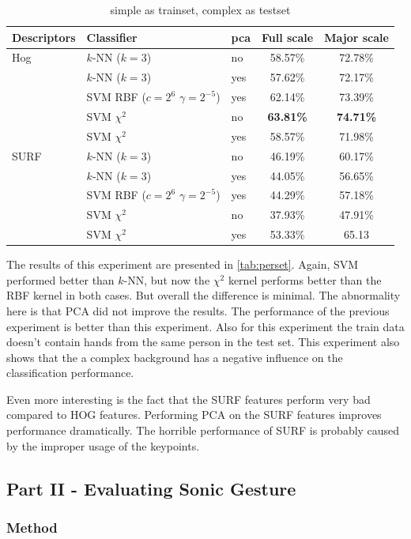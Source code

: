 \begin{table}
\centering
\begin{tabular}{lllcc}
\hline\hline
Descriptors & Classifier 		& pca		&  	Full scale	&	Major scale	\\
\hline
Hog & $k$-NN ($k=3$)& no	&	58.57\% 	&	72.78\%	\\
& $k$-NN ($k=3$)	& yes	&	57.62\% 	&	72.17\%	\\
& SVM RBF ($c=2^6$ $\gamma=2^{-5}$)			& yes & 62.14\%	&	73.39\%	\\
& SVM $\chi^2$ 		&	no	&	\textbf{63.81\%}		&	\textbf{74.71\%}\\
& SVM $\chi^2$		&	yes &	58.57\% 	&	71.98\% \\
\hline
SURF & $k$-NN ($k=3$)&	no	&	46.19\% 	&	60.17\%	\\
& $k$-NN ($k=3$)	&	yes &	44.05\%		& 56.65\% \\
& SVM RBF ($c=2^6$ $\gamma=2^{-5}$)			& yes &	44.29\%	&	57.18\%	\\
& SVM $\chi^2$		&	no	&	37.93\%		&	47.91\%	\\
& SVM $\chi^2$		&	yes	&	53.33\% 	&	65.13 \\
\hline
\end{tabular}
\caption{simple as trainset, complex as testset}
\label{tab:perset}
\end{table}

The results of this experiment are presented in \autoref{tab:perset}. Again, SVM performed better than $k$-NN, but now the $\chi^2$ kernel performs better than the RBF kernel in both cases. But overall the difference is minimal. The abnormality here is that PCA did not improve the results. The performance of the previous experiment is better than this experiment. Also for this experiment the train data doesn't contain hands from the same person in the test set. This experiment also shows that the a complex background has a negative influence on the classification performance. 

Even more interesting is the fact that the SURF features perform very bad compared to HOG features. Performing PCA on the SURF features improves performance dramatically. The horrible performance of SURF is probably caused by the improper usage of the keypoints.


\subsection{Part II - Evaluating Sonic Gesture}

\subsubsection{Method}

